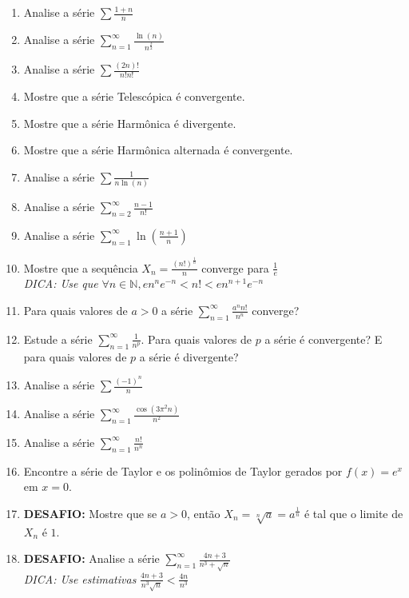 \documentclass[oneside,a4paper,12pt]{article}
\begin{document}
\begin{enumerate}
	\item Analise a série $\displaystyle \sum \frac{1+n}{n}$
	\item Analise a série $\displaystyle \sum_{n=1}^{\infty}\frac{\ln(n)}{n^{\frac{3}{2}}}$
	\item Analise a série $\displaystyle \sum \frac{(2n)!}{n!n!}$
	\item Mostre que a série Telescópica é convergente.
	\item Mostre que a série Harmônica é divergente.
	\item Mostre que a série Harmônica alternada é convergente.
	\item Analise a série $\displaystyle \sum \frac{1}{n\ln(n)}$
	\item Analise a série $\displaystyle \sum_{n=2}^{\infty}\frac{n-1}{n!}$
	\item Analise a série $\displaystyle \sum_{n=1}^{\infty}\ln\left(\frac{n+1}{n}\right)$
	\item Mostre que a sequência $X_n = \displaystyle \frac{(n!)^{\frac{1}{n}}}{n}$ converge para $\displaystyle \frac{1}{e}$ \\ \emph{DICA: Use que} $\forall n \in \mathbb{N}, en^ne^{-n}<n!<en^{n+1}e^{-n}$
	\item Para quais valores de $a>0$ a série $\displaystyle \sum_{n=1}^{\infty}\frac{a^nn!}{n^n}$ converge?
	\item Estude a série $\displaystyle \sum_{n=1}^{\infty}\frac{1}{n^p}$. Para quais valores de $p$ a série é convergente? E para quais valores de $p$ a série é divergente?
	\item Analise a série $\displaystyle \sum \frac{(-1)^n}{n}$
	\item Analise a série $\displaystyle \sum_{n=1}^{\infty}\frac{\cos(3\pi^2n)}{n^2}$
	\item Analise a série $\displaystyle \sum_{n=1}^{\infty}\frac{n!}{n^n}$
	\item Encontre a série de Taylor e os polinômios de Taylor gerados por $f(x)=e^x$ em $x=0$.
	\item {\bf DESAFIO:} Mostre que se $a>0$, então $X_n = \displaystyle \sqrt[n]{a}=a^{\frac{1}{n}}$ é tal que o limite de $X_n$ é $1$.
	\item {\bf DESAFIO:} Analise a série $\displaystyle \sum_{n=1}^{\infty}\frac{4n+3}{n^3+\sqrt{n}}$\\ \emph{DICA: Use estimativas} $\displaystyle \frac{4n+3}{n^3\sqrt{n}} < \frac{4n}{n^3}$



\end{enumerate}


	
\end{document}
